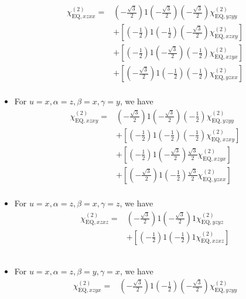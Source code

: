 \documentclass[UTF8,10pt,a4paper]{article}
\begin{document}
\begin{itemize}
\begin{align}
\nonumber\chi_{\text{EQ},xzxx}^{(2)}=&\left(-\frac{\sqrt{3}}{2}\right)1\left(-\frac{\sqrt{3}}{2}\right)\left(-\frac{\sqrt{3}}{2}\right)\chi_{\text{EQ},yzyy}^{(2)}\\
\nonumber&+\left[\left(-\frac{1}{2}\right)1\left(-\frac{1}{2}\right)\left(-\frac{\sqrt{3}}{2}\right)\chi_{\text{EQ},xzxy}^{(2)}\right]\\
\nonumber&+\left[\left(-\frac{1}{2}\right)1\left(-\frac{\sqrt{3}}{2}\right)\left(-\frac{1}{2}\right)\chi_{\text{EQ},xzyx}^{(2)}\right]\\
\nonumber&+\left[\left(-\frac{\sqrt{3}}{2}\right)1\left(-\frac{1}{2}\right)\left(-\frac{1}{2}\right)\chi_{\text{EQ},yzxx}^{(2)}\right]\\
&
\end{align}\normalsize
\item For $u=x,\alpha=z,\beta=x,\gamma=y$, we have
\footnotesize\begin{align}
\nonumber\chi_{\text{EQ},xzxy}^{(2)}=&\left(-\frac{\sqrt{3}}{2}\right)1\left(-\frac{\sqrt{3}}{2}\right)\left(-\frac{1}{2}\right)\chi_{\text{EQ},yzyy}^{(2)}\\
\nonumber&+\left[\left(-\frac{1}{2}\right)1\left(-\frac{1}{2}\right)\left(-\frac{1}{2}\right)\chi_{\text{EQ},xzxy}^{(2)}\right]\\
\nonumber&+\left[\left(-\frac{1}{2}\right)1\left(-\frac{\sqrt{3}}{2}\right)\frac{\sqrt{3}}{2}\chi_{\text{EQ},xzyx}^{(2)}\right]\\
\nonumber&+\left[\left(-\frac{\sqrt{3}}{2}\right)1\left(-\frac{1}{2}\right)\frac{\sqrt{3}}{2}\chi_{\text{EQ},yzxx}^{(2)}\right]\\
&
\end{align}\normalsize
\item For $u=x,\alpha=z,\beta=x,\gamma=z$, we have
\footnotesize\begin{align}
\nonumber\chi_{\text{EQ},xzxz}^{(2)}=&\left(-\frac{\sqrt{3}}{2}\right)1\left(-\frac{\sqrt{3}}{2}\right)1\chi_{\text{EQ},yzyz}^{(2)}\\
\nonumber&+\left[\left(-\frac{1}{2}\right)1\left(-\frac{1}{2}\right)1\chi_{\text{EQ},xzxz}^{(2)}\right]\\
\nonumber&\\
\nonumber&\\
&
\end{align}\normalsize
\item For $u=x,\alpha=z,\beta=y,\gamma=x$, we have
\footnotesize\begin{align}
\nonumber\chi_{\text{EQ},xzyx}^{(2)}=&\left(-\frac{\sqrt{3}}{2}\right)1\left(-\frac{1}{2}\right)\left(-\frac{\sqrt{3}}{2}\right)\chi_{\text{EQ},yzyy}^{(2)}\\

\end{align}
\end{itemize}
\end{document}
